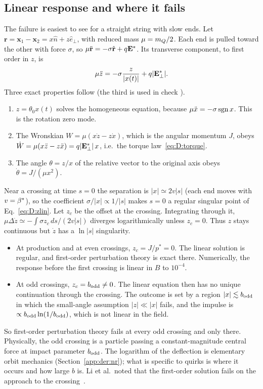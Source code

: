 \subsection{Linear response and where it fails}\label{app:der:linear}
The failure is easiest to see for a straight string with slow ends. Let $\mathbf r=\mathbf x_1-\mathbf x_2=x\hat
n+z\hat e_\perp$, with reduced mass $\mu=m_Q/2$. Each end is pulled toward the other with force $\sigma$, so
$\mu\ddot{\mathbf r}=-\sigma\hat{\mathbf r}+q\mathbf{E}^*$. Its transverse component, to first order in $z$, is
\begin{equation}
  \mu\ddot z=-\sigma\frac{z}{|x(t)|}+q|\mathbf{E}^*_\perp| .
  \label{eq:D:zlin}
\end{equation}
Three exact properties follow (the third is used in check ).
\begin{enumerate}
\item $z=\theta_0x(t)$ solves the homogeneous equation, because $\mu\ddot x=-\sigma\,{\rm sgn}\,x$. This is the
  rotation zero mode.
\item The Wronskian $W=\mu(x\dot z-z\dot x)$, which is the angular momentum $J$, obeys
  $\dot W=\mu(x\ddot z-z\ddot x)=q|\mathbf{E}^*_\perp|\,x$, i.e.\ the torque law~\eqref{eq:D:torque}.
\item The angle $\theta=z/x$ of the relative vector to the original axis obeys $\dot\theta=J/(\mu x^2)$.
\end{enumerate}
Near a crossing at time $s=0$ the separation is $|x|\simeq2v|s|$ (each end moves with $v=\beta^*$), so the coefficient
$\sigma/|x|\propto1/|s|$ makes $s=0$ a regular singular point of Eq.~\eqref{eq:D:zlin}. Let $z_c$ be the offset at the
crossing. Integrating through it, $\mu\Delta\dot z\simeq-\int\sigma z_c\,ds/(2v|s|)$ diverges logarithmically unless
$z_c=0$. Thus $z$ stays continuous but $\dot z$ has a $\ln|s|$ singularity.
\begin{itemize}
\item At production and at even crossings, $z_c=J/p^*=0$. The linear solution is regular, and first-order perturbation
  theory is exact there. Numerically, the response before the first crossing is linear in $B$ to $10^{-4}$.
\item At odd crossings, $z_c=b_{\rm odd}\ne0$. The linear equation then has no unique continuation through the crossing. The
  outcome is set by a region $|x|\lesssim b_{\rm odd}$ in which the small-angle assumption $|z|\ll|x|$ fails, and the impulse
  is $\propto b_{\rm odd}\ln(1/b_{\rm odd})$, which is not linear in the field.
\end{itemize}
So first-order perturbation theory fails at every odd crossing and only there. Physically, the odd crossing is a
particle passing a constant-magnitude central force at impact parameter $b_{\rm odd}$. The logarithm of the deflection is
elementary orbit mechanics (Section~\ref{app:der:nr}); what is specific to quirks is where it occurs and how large $b$ is.
Li et al.\ noted that the first-order solution fails on the approach to the crossing~\cite[App.~A]{Li:2020aoq}.

